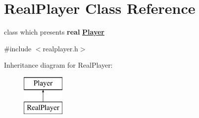 \hypertarget{class_real_player}{}\section{Real\+Player Class Reference}
\label{class_real_player}


class which presents {\bfseries{real}} {\bfseries{\mbox{\hyperlink{class_player}{Player}}}}  




{\ttfamily \#include $<$realplayer.\+h$>$}

Inheritance diagram for Real\+Player\+:\begin{figure}[H]
\begin{center}
\leavevmode
\includegraphics[height=2.000000cm]{d0/db9/class_real_player}
\end{center}
\end{figure}
